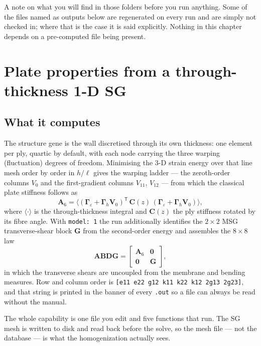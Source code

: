 A note on what you will find in those folders before you run anything. Some of
the files named as outputs below are regenerated on every run and are simply not
checked in; where that is the case it is said explicitly. Nothing in this
chapter depends on a pre-computed file being present.

\section{Plate properties from a through-thickness 1-D SG}
\label{sec:solid-plate1d}

\subsection{What it computes}

The structure gene is the wall discretised through its own thickness: one
element per ply, quartic by default, with each node carrying the three warping
(fluctuation) degrees of freedom. Minimising the 3-D strain energy over that
line mesh order by order in $h/\ell$ gives the warping ladder --- the
zeroth-order columns $V_0$ and the first-gradient columns $V_{11}$, $V_{12}$ ---
from which the classical plate stiffness follows as
%
\begin{equation}
\mathbf{A}_6 = \big\langle (\mathbf{\Gamma}_\varepsilon
 + \mathbf{\Gamma}_h \mathbf{V}_0)^{\mathsf T}\,
 \mathbf{C}(z)\,
 (\mathbf{\Gamma}_\varepsilon + \mathbf{\Gamma}_h \mathbf{V}_0) \big\rangle ,
\label{eq:solid-A6}
\end{equation}
%
where $\langle\cdot\rangle$ is the through-thickness integral and
$\mathbf{C}(z)$ the ply stiffness rotated by its fibre angle. With
\texttt{model: 1} the run additionally identifies the $2\times2$ MSG
transverse-shear block $\mathbf{G}$ from the second-order energy and assembles
the $8\times8$ law
%
\begin{equation}
\mathbf{ABDG} =
\begin{bmatrix} \mathbf{A}_6 & \mathbf{0} \\ \mathbf{0} & \mathbf{G} \end{bmatrix},
\label{eq:solid-abdg}
\end{equation}
%
in which the transverse shears are uncoupled from the membrane and bending
measures. Row and column order is
\texttt{[e11 e22 g12 k11 k22 k12 2g13 2g23]}, and that string is printed in the
banner of every \texttt{.out} so a file can always be read without the manual.

The whole capability is one file you edit and five functions that run. The SG
mesh is written to disk and read back before the solve, so the mesh file --- not
the database --- is what the homogenization actually sees.


